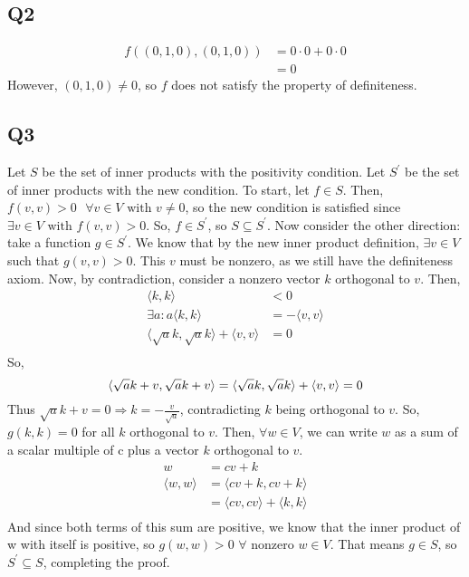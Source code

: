\documentclass{article}
\begin{document}
\subsection*{Q2}
	\begin{align*}
		f((0, 1, 0), (0, 1, 0)) &= 0 \cdot 0 + 0\cdot 0\\
		&=0
	\end{align*}
	However, $(0, 1, 0) \neq 0$, so $f$ does not satisfy the property of definiteness.
	
\subsection*{Q3}
Let $S$ be the set of inner products with the positivity condition. 
Let  $S^\prime$ be the set of inner products with the new condition. To start, let $f \in S$. Then, $f(v, v) > 0 \text{ } \forall v \in V \text{ with } v \neq 0$, so the new condition is satisfied since $\exists v \in V \text{ with } f(v, v) > 0$. So, $f \in S^\prime$, so $S \subseteq S^\prime$. 
Now consider the other direction: take a function $g \in S^\prime$. We know that by the new inner product definition, $\exists v \in V$ such that $g(v, v) > 0$. This $v$ must be nonzero, as we still have the definiteness axiom. Now, by contradiction, consider a nonzero vector $k$ orthogonal to $v$. Then, 
\begin{align*}
	\langle k , k \rangle &< 0\\
	\exists a: a \langle k, k \rangle &= - \langle v, v \rangle\\
	\langle \sqrt{a}k, \sqrt{a}k\rangle + \langle v, v \rangle &= 0\\
\end{align*}
So, 
\begin{equation*}
	\langle \sqrt{a}k + v, \sqrt{a}k + v \rangle = \langle \sqrt{a}k, \sqrt{a}k\rangle + \langle v, v \rangle = 0\\
\end{equation*}
Thus $\sqrt{a}k + v = 0 \Rightarrow k = -\frac{v}{\sqrt{a}}$, contradicting $k$ being orthogonal to $v$. So, $g(k, k) = 0$ for all $k$ orthogonal to $v$. Then, $\forall w \in V$, we can write $w$ as a sum of a scalar multiple of c plus a vector $k$ orthogonal to $v$. 
\begin{align*}
w&= cv + k\\
\langle w, w \rangle &= \langle cv+k, cv+k \rangle\\
&= \langle cv, cv \rangle + \langle k, k \rangle\\
\end{align*}
And since both terms of this sum are positive, we know that the inner product of w with itself is positive, so $g(w, w) > 0$ $\forall$ nonzero $w \in V$. That means $g \in S$, so  $S^\prime \subseteq S$, completing the proof.
\end{document}
